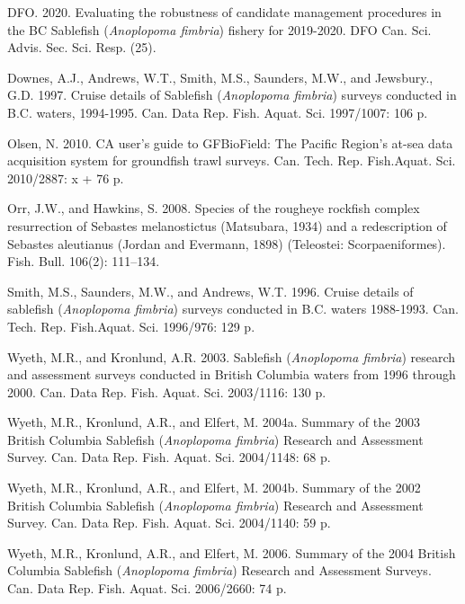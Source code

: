 \documentclass[12pt]{article}\usepackage[]{graphicx}\usepackage[]{color}
\begin{document}
\leavevmode\hypertarget{ref-dfo2020}{}%
DFO. 2020. Evaluating the robustness of candidate management procedures in the BC Sablefish (\emph{Anoplopoma fimbria}) fishery for 2019-2020. DFO Can. Sci. Advis. Sec. Sci. Resp. (25).

\leavevmode\hypertarget{ref-Downes1997}{}%
Downes, A.J., Andrews, W.T., Smith, M.S., Saunders, M.W., and Jewsbury., G.D. 1997. Cruise details of Sablefish (\emph{Anoplopoma fimbria}) surveys conducted in B.C. waters, 1994-1995. Can. Data Rep. Fish. Aquat. Sci. 1997/1007: 106 p.

\leavevmode\hypertarget{ref-Olsen2010}{}%
Olsen, N. 2010. CA user's guide to GFBioField: The Pacific Region's at-sea data acquisition system for groundfish trawl surveys. Can. Tech. Rep. Fish.Aquat. Sci. 2010/2887: x + 76 p.

\leavevmode\hypertarget{ref-Orr2008}{}%
Orr, J.W., and Hawkins, S. 2008. Species of the rougheye rockfish complex resurrection of Sebastes melanostictus (Matsubara, 1934) and a redescription of Sebastes aleutianus (Jordan and Evermann, 1898) (Teleostei: Scorpaeniformes). Fish. Bull. 106(2): 111--134.

\leavevmode\hypertarget{ref-Smith1996}{}%
Smith, M.S., Saunders, M.W., and Andrews, W.T. 1996. Cruise details of sablefish (\emph{Anoplopoma fimbria}) surveys conducted in B.C. waters 1988-1993. Can. Tech. Rep. Fish.Aquat. Sci. 1996/976: 129 p.

\leavevmode\hypertarget{ref-Wyeth2003}{}%
Wyeth, M.R., and Kronlund, A.R. 2003. Sablefish (\emph{Anoplopoma fimbria}) research and assessment surveys conducted in British Columbia waters from 1996 through 2000. Can. Data Rep. Fish. Aquat. Sci. 2003/1116: 130 p.

\leavevmode\hypertarget{ref-Wyeth2004b}{}%
Wyeth, M.R., Kronlund, A.R., and Elfert, M. 2004a. Summary of the 2003 British Columbia Sablefish (\emph{Anoplopoma fimbria}) Research and Assessment Survey. Can. Data Rep. Fish. Aquat. Sci. 2004/1148: 68 p.

\leavevmode\hypertarget{ref-Wyeth2004a}{}%
Wyeth, M.R., Kronlund, A.R., and Elfert, M. 2004b. Summary of the 2002 British Columbia Sablefish (\emph{Anoplopoma fimbria}) Research and Assessment Survey. Can. Data Rep. Fish. Aquat. Sci. 2004/1140: 59 p.

\leavevmode\hypertarget{ref-Wyeth2006}{}%
Wyeth, M.R., Kronlund, A.R., and Elfert, M. 2006. Summary of the 2004 British Columbia Sablefish (\emph{Anoplopoma fimbria}) Research and Assessment Surveys. Can. Data Rep. Fish. Aquat. Sci. 2006/2660: 74 p.
\end{document}
